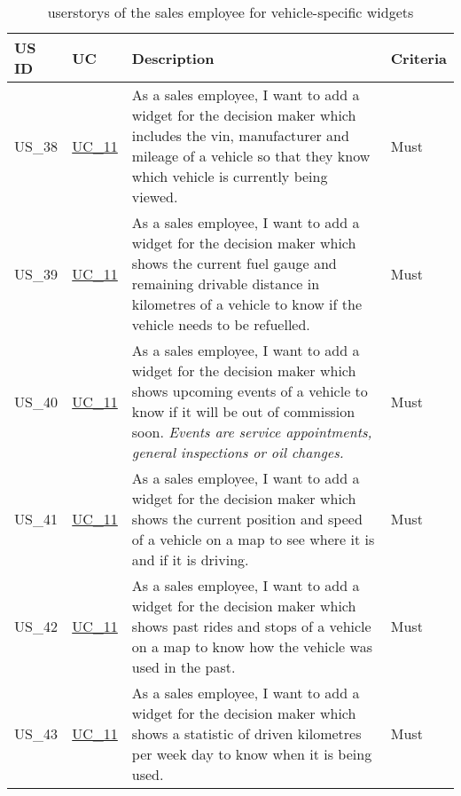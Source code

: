   \rmfamily

  \sffamily
  \begin{footnotesize}
    \label{FahrzeugWidgets}
    \begin{longtable}[L L L]{ p{} p{} p{} p{} }
      \caption                       %
          {\Glspl{userstory} of the sales employee for vehicle-specific \glspl{widget}} %
          \\
      \toprule
      \textbf{US ID} & \textbf{UC} & \textbf{Description} & \textbf{Criteria} \\
      \midrule
      \hypertarget{Ref:US38}{US\_38} & \hyperlink{Ref:UC11}{UC\_11} & As a sales employee, I want to add a \gls{widget} for the decision maker which includes the \gls{vin}, manufacturer and mileage of a vehicle so that they know which vehicle is currently being viewed. & Must \\
      \hypertarget{Ref:US39}{US\_39} & \hyperlink{Ref:UC11}{UC\_11} & As a sales employee, I want to add a \gls{widget} for the decision maker which shows the current fuel gauge and remaining drivable distance in kilometres of a vehicle to know if the vehicle needs to be refuelled. & Must \\
      \hypertarget{Ref:US40}{US\_40} & \hyperlink{Ref:UC11}{UC\_11} & As a sales employee, I want to add a \gls{widget} for the decision maker which shows upcoming events of a vehicle to know if it will be out of commission soon.
      \newline
      \emph{Events are service appointments, general inspections or oil changes.} & Must \\
      \hypertarget{Ref:US41}{US\_41} & \hyperlink{Ref:UC11}{UC\_11} & As a sales employee, I want to add a \gls{widget} for the decision maker which shows the current position and speed of a vehicle on a map to see where it is and if it is driving. & Must \\
      \hypertarget{Ref:US42}{US\_42} & \hyperlink{Ref:UC11}{UC\_11} & As a sales employee, I want to add a \gls{widget} for the decision maker which shows past rides and stops of a vehicle on a map to know how the vehicle was used in the past. & Must \\
      \hypertarget{Ref:US43}{US\_43} & \hyperlink{Ref:UC11}{UC\_11} & As a sales employee, I want to add a \gls{widget} for the decision maker which shows a statistic of driven kilometres per week day to know when it is being used. & Must \\

\end{longtable}
\end{footnotesize}
